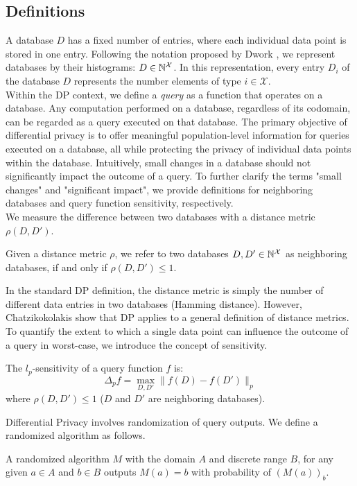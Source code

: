 \subsection{Definitions}\label{subsec:background-dp-definitions}
A database $D$ has a fixed number of entries, where each individual data point is stored in one entry.
Following the notation proposed by Dwork \etal \cite{dwork2014algorithmic}, we represent databases by their histograms: $D \in \mathbb{N}^\mathcal{X}$. 
In this representation, every entry $D_i$ of the database $D$ represents the number elements of type $i \in \mathcal{X}$.
\\  
Within the DP context, we define a \textit{query} as a function that operates on a database. 
Any computation performed on a database, regardless of its codomain, can be regarded as a query executed on that database.
The primary objective of differential privacy is to offer meaningful population-level information for queries executed on a database, all while protecting the privacy of individual data points within the database.
Intuitively, small changes in a database should not significantly impact the outcome of a query.
To further clarify the terms "small changes" and "significant impact", we provide definitions for neighboring databases and query function sensitivity, respectively.
\\
We measure the difference between two databases with a distance metric $\rho(D, D')$.
\begin{definition}
  Given a distance metric $\rho$, we refer to two databases $D, D' \in \mathbb{N}^\mathcal{X}$ as neighboring databases, if and only if $\rho(D, D') \leq 1$.             
\end{definition}
\noindent In the standard DP definition, the distance metric is simply the number of different data entries in two databases (\ie Hamming distance).
However, Chatzikokolakis \etal \cite{chatzikokolakis2013broadening} show that DP applies to a general definition of distance metrics.
\\
To quantify the extent to which a single data point can influence the outcome of a query in worst-case, we introduce the concept of sensitivity. 
\begin{definition}[$l_p$-Sensitivity]
  \label{def:norm-sensitivity}
  The $l_p$-sensitivity of a query function $f$ is:
  \begin{equation*}
    \Delta_p f = \max_{D, D'} \|f(D) - f(D')\|_p 
  \end{equation*}
where $\rho(D, D') \leq 1$ (\ie $D$ and $D'$ are neighboring databases).
\end{definition}
\noindent
Differential Privacy involves randomization of query outputs. We define a randomized algorithm as follows.
\begin{definition}
  \label{def:randomized-algorithm}
  A randomized algorithm $M$ with the domain $A$ and discrete range $B$, for any given $a \in A$ and $b \in B$ outputs $M(a)= b$ with probability of $(M(a))_b$.
\end{definition}

